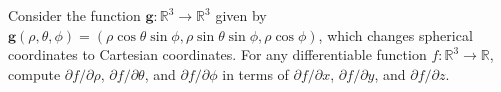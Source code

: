 \begin{problem}
Consider the function $\mathbf{g}:\mathbb{R}^3\rightarrow\mathbb{R}^3$ given by $\mathbf{g}(\rho, \theta, \phi) = (\rho\cos\theta\sin\phi, \rho\sin\theta\sin\phi,\rho\cos\phi)$, which changes spherical coordinates to Cartesian coordinates. For any differentiable function $f:\mathbb{R}^3\rightarrow\mathbb{R}$, compute $\partial f/\partial\rho$, $\partial f/\partial\theta$, and $\partial f/\partial\phi$ in terms of $\partial f/\partial x$, $\partial f/\partial y$, and $\partial f/\partial z$.
\end{problem}